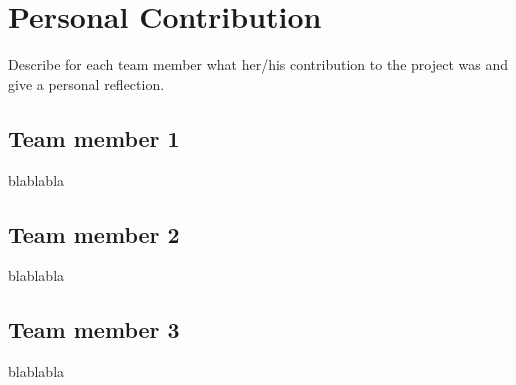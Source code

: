 \section{Personal Contribution}
Describe for each team member what her/his contribution to the project was and give a personal reflection.

\subsection{Team member 1}
blablabla

\subsection{Team member 2}
blablabla

\subsection{Team member 3}
blablabla